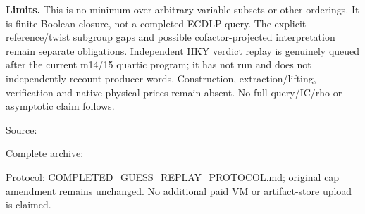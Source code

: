 \documentclass[10pt]{article}
\begin{document}
\textbf{Limits.} This is no minimum over arbitrary variable subsets or
other orderings. It is finite Boolean closure, not a completed ECDLP query.
The explicit reference/twist subgroup gaps and possible cofactor-projected
interpretation remain separate obligations. Independent HKY verdict replay
is genuinely queued after the current m14/15 quartic program; it has not
run and does not independently recount producer words. Construction,
extraction/lifting, verification and native physical prices remain absent.
No full-query/IC/rho or asymptotic claim follows.

\begin{flushleft}\footnotesize
Source: \par
Complete archive: \par
Protocol: COMPLETED_GUESS_REPLAY_PROTOCOL.md; original cap amendment remains
unchanged. No additional paid VM or artifact-store upload is claimed.
\end{flushleft}
\end{document}
